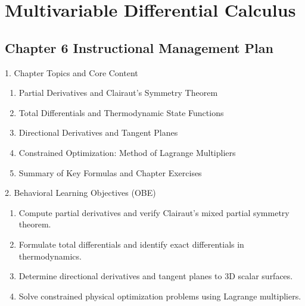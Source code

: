 \chapter{Multivariable Differential Calculus}

\section*{Chapter 6 Instructional Management Plan}

\begin{planbox}[colframe=rbruNavy, colbacktitle=rbruNavy]{1. Chapter Topics and Core Content}
\begin{enumerate}[topsep=2pt, itemsep=1pt, partopsep=0pt, parsep=0pt, leftmargin=1.5em]
    \item Partial Derivatives and Clairaut's Symmetry Theorem
    \item Total Differentials and Thermodynamic State Functions
    \item Directional Derivatives and Tangent Planes
    \item Constrained Optimization: Method of Lagrange Multipliers
    \item Summary of Key Formulas and Chapter Exercises
\end{enumerate}
\end{planbox}

\begin{planbox}[colframe=rbruGreen, colbacktitle=rbruGreen]{2. Behavioral Learning Objectives (OBE)}
\begin{enumerate}[topsep=2pt, itemsep=1pt, partopsep=0pt, parsep=0pt, leftmargin=1.5em]
    \item Compute partial derivatives and verify Clairaut's mixed partial symmetry theorem.
    \item Formulate total differentials and identify exact differentials in thermodynamics.
    \item Determine directional derivatives and tangent planes to 3D scalar surfaces.
    \item Solve constrained physical optimization problems using Lagrange multipliers.
\end{enumerate}
\end{planbox}

